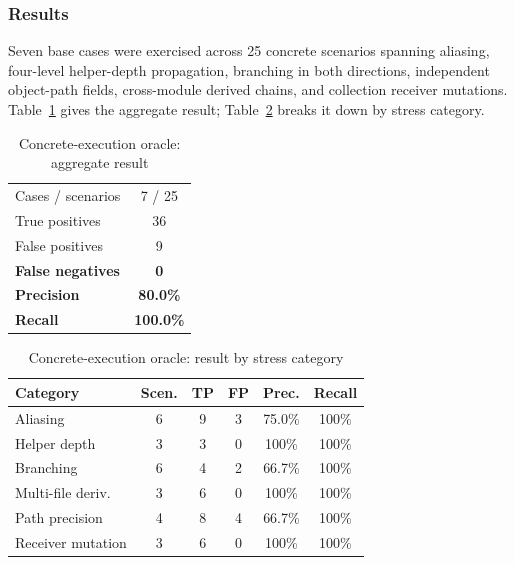 \documentclass[conference]{IEEEtran}
\begin{document}
\subsubsection{Results}
Seven base cases were exercised across 25 concrete scenarios spanning
aliasing, four-level helper-depth propagation, branching in both directions,
independent object-path fields, cross-module derived chains, and collection
receiver mutations. Table~\ref{tab:oracle-agg} gives the aggregate result;
Table~\ref{tab:oracle-cat} breaks it down by stress category.

\begin{table}[h]
\centering
\caption{Concrete-execution oracle: aggregate result}
\label{tab:oracle-agg}
\footnotesize
\begin{tabular}{@{}lc@{}}
\toprule
Cases / scenarios & 7 / 25 \\
True positives & 36 \\
False positives & 9 \\
\textbf{False negatives} & \textbf{0} \\
\textbf{Precision} & \textbf{80.0\%} \\
\textbf{Recall} & \textbf{100.0\%} \\
\bottomrule
\end{tabular}
\end{table}

\begin{table}[h]
\centering
\caption{Concrete-execution oracle: result by stress category}
\label{tab:oracle-cat}
\footnotesize
\begin{tabular}{@{}lccccc@{}}
\toprule
\textbf{Category} & Scen. & TP & FP & Prec. & Recall \\
\midrule
Aliasing & 6 & 9 & 3 & 75.0\% & 100\% \\
Helper depth & 3 & 3 & 0 & 100\% & 100\% \\
Branching & 6 & 4 & 2 & 66.7\% & 100\% \\
Multi-file deriv. & 3 & 6 & 0 & 100\% & 100\% \\
Path precision & 4 & 8 & 4 & 66.7\% & 100\% \\
Receiver mutation & 3 & 6 & 0 & 100\% & 100\% \\
\bottomrule
\end{tabular}
\end{table}
\end{document}
